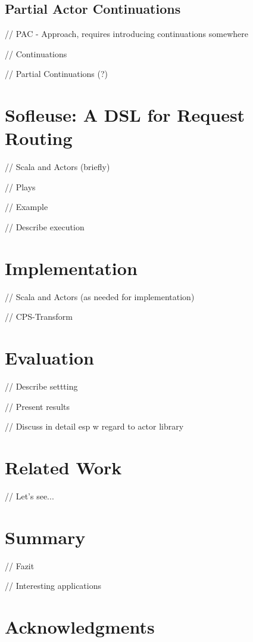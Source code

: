 \documentclass{sig-alternate}
\begin{document}
\subsection{Partial Actor Continuations}

// PAC - Approach, requires introducing continuations somewhere
              
// Continuations

// Partial Continuations (?)

                         



\section{Sofleuse: A DSL for Request Routing}
    
// Scala and Actors (briefly)
          
// Plays

// Example

// Describe execution

           
\section{Implementation}
                  
// Scala and Actors (as needed for implementation)

// CPS-Transform 


\section{Evaluation}

// Describe settting

// Present results

// Discuss in detail esp w regard to actor library


\section{Related Work}

// Let's see...

\section{Summary}
                  
// Fazit

// Interesting applications

\section{Acknowledgments}


%  
\end{document}
